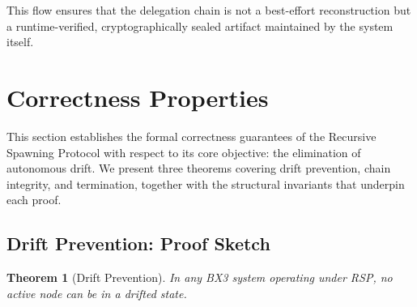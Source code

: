 \documentclass[12pt]{article}
\newtheorem{thrm}[section]{Theorem}
\begin{document}
This flow ensures that the delegation chain is not a best-effort reconstruction but a runtime-verified, cryptographically sealed artifact maintained by the system itself.


\section{Correctness Properties}

This section establishes the formal correctness guarantees of the Recursive Spawning Protocol with respect to its core objective: the elimination of autonomous drift. We present three theorems covering drift prevention, chain integrity, and termination, together with the structural invariants that underpin each proof.

\subsection{Drift Prevention: Proof Sketch}

\begin{thrm}[Drift Prevention]
\label{thrm:drift-prevention}
In any BX3 system operating under RSP, no active node can be in a drifted state.
\end{thrm}
\end{document}
